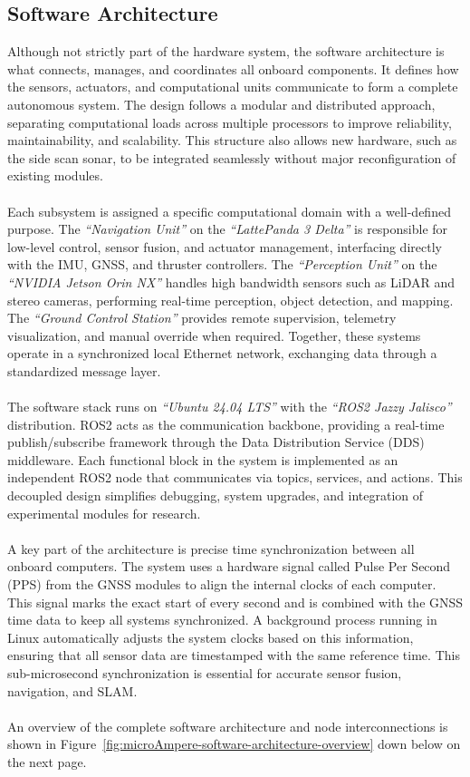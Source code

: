 \subsection{Software Architecture}
Although not strictly part of the hardware system, the software architecture is what connects, manages, and coordinates all onboard components. It defines how the sensors, actuators, and computational units communicate to form a complete autonomous system. The design follows a modular and distributed approach, separating computational loads across multiple processors to improve reliability, maintainability, and scalability. This structure also allows new hardware, such as the side scan sonar, to be integrated seamlessly without major reconfiguration of existing modules.
\\ \\
Each subsystem is assigned a specific computational domain with a well-defined purpose. The \textit{``Navigation Unit''} on the \textit{``LattePanda 3 Delta''} is responsible for low-level control, sensor fusion, and actuator management, interfacing directly with the IMU, GNSS, and thruster controllers. The \textit{``Perception Unit''} on the \textit{``NVIDIA Jetson Orin NX''} handles high bandwidth sensors such as LiDAR and stereo cameras, performing real-time perception, object detection, and mapping. The \textit{``Ground Control Station''} provides remote supervision, telemetry visualization, and manual override when required. Together, these systems operate in a synchronized local Ethernet network, exchanging data through a standardized message layer.
\\ \\
The software stack runs on \textit{``Ubuntu 24.04 LTS''} with the \textit{``ROS2 Jazzy Jalisco''} distribution. ROS2 acts as the communication backbone, providing a real-time publish/subscribe framework through the Data Distribution Service (DDS) middleware. Each functional block in the system is implemented as an independent ROS2 node that communicates via topics, services, and actions. This decoupled design simplifies debugging, system upgrades, and integration of experimental modules for research.
\\ \\
A key part of the architecture is precise time synchronization between all onboard computers. The system uses a hardware signal called Pulse Per Second (PPS) from the GNSS modules to align the internal clocks of each computer. This signal marks the exact start of every second and is combined with the GNSS time data to keep all systems synchronized. A background process running in Linux automatically adjusts the system clocks based on this information, ensuring that all sensor data are timestamped with the same reference time. This sub-microsecond synchronization is essential for accurate sensor fusion, navigation, and SLAM.
\\ \\
An overview of the complete software architecture and node interconnections is shown in Figure~\ref{fig:microAmpere-software-architecture-overview} down below on the next page.

